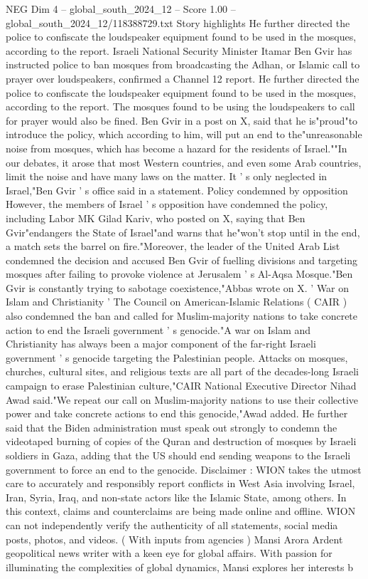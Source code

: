 \begin{textsample}{NEG Dim 4 – global\_south\_2024\_12 – Score 1.00 – global\_south\_2024\_12/118388729.txt}  \label{ex:f4_neg_206}
Story highlights He further directed the police to confiscate the loudspeaker equipment found to be used in the mosques, according to the report.
Israeli National Security Minister Itamar Ben Gvir has instructed police to ban mosques from broadcasting the Adhan, or Islamic call to prayer over loudspeakers, confirmed a Channel 12 report.
He further directed the police to confiscate the loudspeaker equipment found to be used in the mosques, according to the report.
The mosques found to be using the loudspeakers to call for prayer would also be fined.
Ben Gvir in a post on X, said that he is"proud"to introduce the policy, which according to him, will put an end to the"unreasonable noise from mosques, which has become a hazard for the residents of Israel.""In our debates, it arose that most Western countries, and even some Arab countries, limit the noise and have many laws on the matter.
It ' s only neglected in Israel,"Ben Gvir ' s office said in a statement.
Policy condemned by opposition However, the members of Israel ' s opposition have condemned the policy, including Labor MK Gilad Kariv, who posted on X, saying that Ben Gvir"endangers the State of Israel"and warns that he"won't stop until in the end, a match sets the barrel on fire."Moreover, the leader of the United Arab List condemned the decision and accused Ben Gvir of fuelling divisions and targeting mosques after failing to provoke violence at Jerusalem ' s Al-Aqsa Mosque."Ben Gvir is constantly trying to sabotage coexistence,"Abbas wrote on X. ' War on Islam and Christianity ' The Council on American-Islamic Relations ( CAIR ) also condemned the ban and called for Muslim-majority nations to take concrete action to end the Israeli government ' s genocide."A war on Islam and Christianity has always been a major component of the far-right Israeli government ' s genocide targeting the Palestinian people.
Attacks on mosques, churches, cultural sites, and religious texts are all part of the decades-long Israeli campaign to erase Palestinian culture,"CAIR National Executive Director Nihad Awad said."We repeat our call on Muslim-majority nations to use their collective power and take concrete actions to end this genocide,"Awad added.
He further said that the Biden administration must speak out strongly to condemn the videotaped burning of copies of the Quran and destruction of mosques by Israeli soldiers in Gaza, adding that the US should end sending weapons to the Israeli government to force an end to the genocide.
Disclaimer : WION takes the utmost care to accurately and responsibly report conflicts in West Asia involving Israel, Iran, Syria, Iraq, and non-state actors like the Islamic State, among others.
In this context, claims and counterclaims are being made online and offline.
WION can not independently verify the authenticity of all statements, social media posts, photos, and videos. ( With inputs from agencies ) Mansi Arora Ardent geopolitical news writer with a keen eye for global affairs.
With passion for illuminating the complexities of global dynamics, Mansi explores her interests b

\end{textsample}
